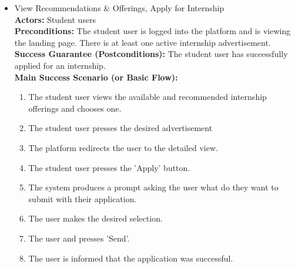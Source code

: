 \begin{itemize}[label={[\textbf{UC}]}, align=left, leftmargin=*]
    \item {} View Recommendations \& Offerings, Apply for Internship \\
     \textbf{Actors:} Student users\\
     \textbf{Preconditions:} The student user is logged into the platform and is viewing the landing page. There is at least one active internship advertisement.\\
     \textbf{Success Guarantee (Postconditions):} The student user has successfully applied for an internship. \\
     \textbf{Main Success Scenario (or Basic Flow):} 
     \begin{enumerate}[label=\arabic*.] 
        \item The student user views the available and recommended internship offerings and chooses one.
        \item The student user presses the desired advertisement 
        \item The platform redirects the user to the detailed view.
        \item The student user presses the 'Apply' button.
        \item The system produces a prompt asking the user what do they want to submit with their application.
        \item The user makes the desired selection.
        \item The user and presses 'Send'.
        \item The user is informed that the application was successful.
     \end{enumerate} \\


\end{itemize}
